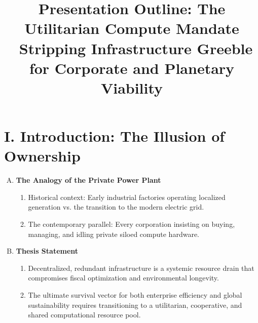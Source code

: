 \documentclass{article}
\begin{document}
	
	\title{Presentation Outline: The Utilitarian Compute Mandate \ \large Stripping Infrastructure Greeble for Corporate and Planetary Viability}
	\author{}
	\date{}
	\maketitle
	
	\section*{I. Introduction: The Illusion of Ownership}
	\begin{enumerate}[A.]
		\item \textbf{The Analogy of the Private Power Plant}
		\begin{enumerate}[1.]
			\item Historical context: Early industrial factories operating localized generation vs. the transition to the modern electric grid.
			\item The contemporary parallel: Every corporation insisting on buying, managing, and idling private siloed compute hardware.
		\end{enumerate}
		\item \textbf{Thesis Statement}
		\begin{enumerate}[1.]
			\item Decentralized, redundant infrastructure is a systemic resource drain that compromises fiscal optimization and environmental longevity.
			\item The ultimate survival vector for both enterprise efficiency and global sustainability requires transitioning to a utilitarian, cooperative, and shared computational resource pool.
		\end{enumerate}
	\end{enumerate}
	
\end{document}
